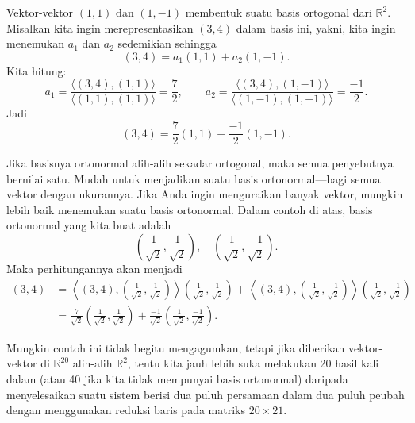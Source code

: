 \begin{example}
Vektor-vektor $(1,1)$ dan $(1,-1)$ membentuk suatu basis ortogonal dari ${\mathbb{R}}^2$.
Misalkan kita ingin merepresentasikan $(3,4)$ dalam basis ini,
yakni, kita ingin menemukan $a_1$ dan $a_2$ sedemikian sehingga
\begin{equation*}
(3,4) = a_1 (1,1) + a_2 (1,-1) .
\end{equation*}
Kita hitung:
\begin{equation*}
a_1 =
\frac{\langle (3,4), (1,1) \rangle}{
\langle (1,1), (1,1) \rangle
}
=
\frac{7}{2}, \qquad
a_2 =
\frac{\langle (3,4), (1,-1) \rangle}{
\langle (1,-1), (1,-1) \rangle
}
=
\frac{-1}{2} .
\end{equation*}
Jadi
\begin{equation*}
(3,4) = \frac{7}{2} (1,1) + \frac{-1}{2} (1,-1) .
\end{equation*}
\end{example}

Jika basisnya ortonormal alih-alih sekadar ortogonal,
maka semua penyebutnya bernilai satu.
Mudah untuk menjadikan suatu basis ortonormal---bagi semua vektor dengan ukurannya.
Jika Anda ingin menguraikan banyak vektor,
mungkin lebih baik menemukan suatu basis ortonormal.
Dalam contoh di atas, basis ortonormal yang kita buat adalah
\begin{equation*}
\left( \frac{1}{\sqrt{2}} , \frac{1}{\sqrt{2}} \right) , \quad
\left( \frac{1}{\sqrt{2}} , \frac{-1}{\sqrt{2}} \right) .
\end{equation*}
Maka perhitungannya akan menjadi
\begin{equation*}
\begin{split}
(3,4)
& =
\left\langle
(3,4)
,
\left( \frac{1}{\sqrt{2}} , \frac{1}{\sqrt{2}} \right)
\right\rangle
\left( \frac{1}{\sqrt{2}} , \frac{1}{\sqrt{2}} \right)
+
\left\langle
(3,4)
,
\left( \frac{1}{\sqrt{2}} , \frac{-1}{\sqrt{2}} \right)
\right\rangle
\left( \frac{1}{\sqrt{2}} , \frac{-1}{\sqrt{2}} \right)
\\
& =
\frac{7}{\sqrt{2}}
\left( \frac{1}{\sqrt{2}} , \frac{1}{\sqrt{2}} \right)
+
\frac{-1}{\sqrt{2}}
\left( \frac{1}{\sqrt{2}} , \frac{-1}{\sqrt{2}} \right) .
\end{split}
\end{equation*}

Mungkin contoh ini tidak begitu mengagumkan, tetapi jika diberikan
vektor-vektor di ${\mathbb{R}}^{20}$ alih-alih ${\mathbb{R}}^2$,
tentu kita jauh lebih suka melakukan 20 hasil kali dalam
(atau 40 jika kita tidak mempunyai basis ortonormal) daripada
menyelesaikan suatu sistem berisi dua puluh persamaan dalam dua puluh peubah
dengan menggunakan reduksi baris pada matriks $20 \times 21$.

